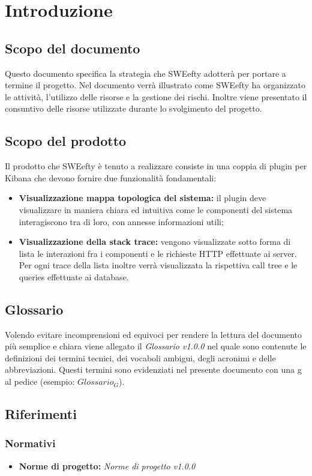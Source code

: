
\section{Introduzione}
	\subsection{Scopo del documento}
	Questo documento specifica la strategia che SWEefty adotterà per portare a termine il progetto.
	Nel documento verrà illustrato come SWEefty ha organizzato le attività, l'utilizzo delle risorse e la gestione dei rischi.
	Inoltre viene presentato il consuntivo delle risorse utilizzate durante lo svolgimento del progetto.
	
	\subsection{Scopo del prodotto}
Il prodotto che SWEefty è tenuto a realizzare consiste in una coppia di plugin per Kibana che devono fornire due funzionalità fondamentali:
\begin{itemize}
	\item \textbf{Visualizzazione mappa topologica del sistema:} il plugin deve visualizzare in maniera chiara ed intuitiva come le componenti del sistema interagiscono tra di loro, con annesse informazioni utili;
	\item \textbf{Visualizzazione della stack trace:} vengono visualizzate sotto forma di lista le interazioni fra i componenti e le richieste HTTP effettuate ai server. Per ogni trace della lista inoltre verrà visualizzata la rispettiva call tree e le queries effettuate ai database.
\end{itemize}

\subsection{Glossario}
Volendo evitare incomprensioni  ed equivoci per rendere la lettura del documento più semplice e chiara viene allegato il \emph{Glossario v1.0.0} nel quale sono contenute le definizioni dei termini tecnici, dei vocaboli ambigui, degli acronimi e delle abbreviazioni. Questi termini sono evidenziati nel presente documento con una g al pedice (esempio: $Glossario_{G}$).
	
	\subsection{Riferimenti}
			\subsubsection{Normativi}
			\begin{itemize}
				\item \textbf{Norme di progetto:} \emph{Norme di progetto v1.0.0}
			\end{itemize}

